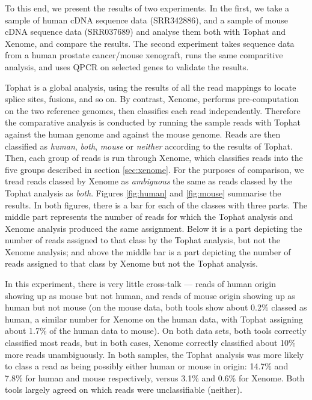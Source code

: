 \documentclass[twocolumn]{article}
\begin{document}
To this end, we present the results of two experiments. In the first, we take a sample of
human cDNA sequence data (SRR342886), and a sample of mouse cDNA sequence data (SRR037689)
and analyse them both with Tophat\cite{tophat} and Xenome, and compare the results.
The second experiment takes sequence data from a human prostate cancer/mouse xenograft,
runs the same comparitive analysis, and uses QPCR on selected genes to validate the results.

Tophat is a global analysis, using the results of all the read mappings to
locate splice sites, fusions, and so on. By contrast, Xenome, performs
pre-computation on the two reference genomes, then classifies each
read independently. Therefore the comparative analysis is conducted
by running the sample reads with Tophat against the human genome and
against the mouse genome. Reads are then classified as \textit{human},
\textit{both}, \textit{mouse} or \textit{neither} according to the results of Tophat.
Then, each group of reads is run through Xenome, which classifies reads into
the five groups described in section \ref{sec:xenome}.
For the purposes of comparison, we tread reads classed by Xenome as \textit{ambiguous}
the same as reads classed by the Tophat analysis as \textit{both}.
Figures \ref{fig:human} and \ref{fig:mouse} summarise the results. In both figures,
there is a bar for each of the classes with three parts. The middle part represents
the number of reads for which the Tophat analysis and Xenome analysis produced the same
assignment. Below it is a part depicting the number of reads assigned to that class
by the Tophat analysis, but not the Xenome analysis; and above the middle bar is a part
depicting the number of reads assigned to that class by Xenome but not the Tophat analysis.

In this experiment, there is very little cross-talk --- reads of human origin showing up as
mouse but not human, and reads of mouse origin showing up as human but not mouse
(on the mouse data, both tools show about 0.2\% classed as human, a similar number for
Xenome on the human data, with Tophat assigning about 1.7\% of the human data to mouse).
On both data sets, both tools correctly classified most reads, but in both cases, Xenome
correctly classified about 10\% more reads unambiguously.
In both samples, the Tophat analysis was more likely to class a read as being possibly
either human or mouse in origin: 14.7\% and 7.8\% for human and mouse respectively,
versus 3.1\% and 0.6\% for Xenome.
Both tools largely agreed on which reads were unclassifiable (neither).
\end{document}
